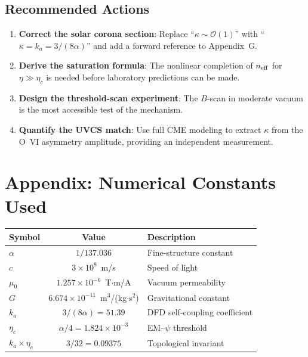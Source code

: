 \documentclass[12pt,a4paper]{article}
\theoremstyle{remark}
\begin{document}
\subsection{Recommended Actions}

\begin{enumerate}
\item \textbf{Correct the solar corona section}: Replace
  ``$\kappa \sim \mathcal{O}(1)$'' with ``$\kappa = k_a = 3/(8\alpha)$''
  and add a forward reference to Appendix~G.

\item \textbf{Derive the saturation formula}: The nonlinear completion
  of $n_{\rm eff}$ for $\eta \gg \eta_c$ is needed before laboratory
  predictions can be made.

\item \textbf{Design the threshold-scan experiment}: The
  $B$-scan in moderate vacuum is the most accessible test of the mechanism.

\item \textbf{Quantify the UVCS match}: Use full CME modeling to
  extract $\kappa$ from the O~VI asymmetry amplitude, providing an
  independent measurement.
\end{enumerate}

\section{Appendix: Numerical Constants Used}

\begin{center}
\begin{tabular}{lcl}
\toprule
Symbol & Value & Description \\
\midrule
$\alpha$ & $1/137.036$ & Fine-structure constant \\
$c$ & $3 \times 10^8$~m/s & Speed of light \\
$\mu_0$ & $1.257 \times 10^{-6}$~T$\cdot$m/A & Vacuum permeability \\
$G$ & $6.674 \times 10^{-11}$~m$^3$/(kg$\cdot$s$^2$) & Gravitational constant \\
$k_a$ & $3/(8\alpha) = 51.39$ & DFD self-coupling coefficient \\
$\eta_c$ & $\alpha/4 = 1.824 \times 10^{-3}$ & EM--$\psi$ threshold \\
$k_a \times \eta_c$ & $3/32 = 0.09375$ & Topological invariant \\
\bottomrule
\end{tabular}
\end{center}
\end{document}
